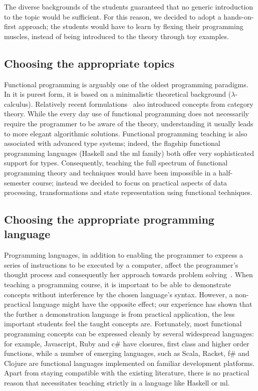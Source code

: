 \documentclass[conference]{IEEEtran}
\begin{document}
The diverse backgrounds of the students guaranteed that no generic
introduction to the topic would be sufficient. For this reason, we decided
to adopt a hands-on-first approach; the students would have to learn by
flexing their programming muscles, instead of being introduced to 
the theory through toy examples.

\subsection{Choosing the appropriate topics}

Functional programming is arguably one of the oldest programming paradigms. In it is
purest form, it is based on a minimalistic theoretical background
($\lambda$-calculus). Relatively recent
formulations~\cite{Meije91, Wadle93} also introduced concepts from category
theory. While the every day use of functional programming does not necessarily
require the programmer to be aware of the theory, understanding it usually leads
to more elegant algorithmic solutions. Functional programming teaching is also
associated with advanced type systems; indeed, the flagship functional
programming languages (Haskell and the {\sc ml} family) both offer very
sophisticated support for types. Consequently, teaching the full spectrum of
functional programming theory and techniques would have been impossible in a
half-semester course; instead we decided to focus on practical aspects of data
processing, transformations and state representation using functional
techniques.

\subsection{Choosing the appropriate programming language}

Programming languages, in addition to enabling the programmer to express a
series of instructions to be executed by a computer, affect the programmer's
thought process and consequently her approach towards problem
solving~\cite{Ivers80}.  When teaching a programming course, it is important to
be able to demonstrate concepts without interference by the chosen language's
syntax. However, a non-practical language might have the opposite effect; our
experience has shown that the further a demonstration language is from practical
application, the less important students feel the taught concepts are.
Fortunately, most functional programming concepts can be expressed cleanly by
several widespread languages: for example, Javascript, Ruby and {\sc c\#} have
closures, first class and higher order functions, while a number of emerging
languages, such as Scala, Racket, {\sc f\#} and Clojure are functional languages
implemented on familiar development platforms. Apart from staying compatible
with the existing literature, there is no practical reason that necessitates
teaching strictly in a language like Haskell or {\sc ml}.
\end{document}
